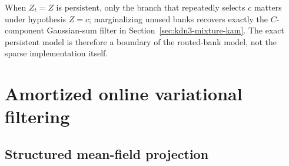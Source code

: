 \documentclass[11pt]{article}
\begin{document}
When $Z_t=Z$ is persistent, only the branch that repeatedly selects $c$ matters under hypothesis
$Z=c$; marginalizing unused banks recovers exactly the $C$-component Gaussian-sum filter in
Section~\ref{sec:kdn3-mixture-kam}.  The exact persistent model is therefore a boundary of the
routed-bank model, not the sparse implementation itself.

\section{Amortized online variational filtering}
\label{sec:kdn3-amortized-vi}

\subsection{Structured mean-field projection}
\end{document}
